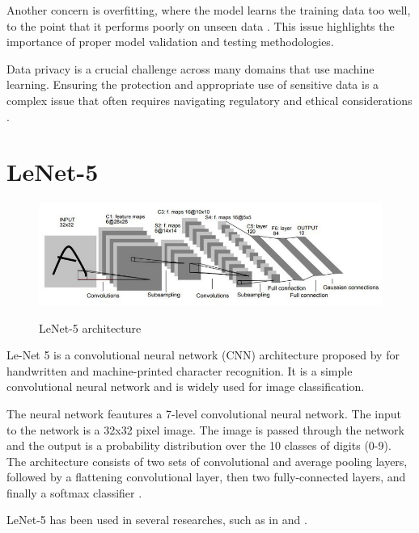 Another concern is overfitting, where the model learns the training data too well, to the point that it performs poorly on unseen data \parencite{Ying2019}. This issue highlights the importance of proper model validation and testing methodologies.

Data privacy is a crucial challenge across many domains that use machine learning. Ensuring the protection and appropriate use of sensitive data is a complex issue that often requires navigating regulatory and ethical considerations \parencite{Strobel2022}.

\newpage
\section{LeNet-5}
\begin{figure}[h]
    \centering
    \includegraphics[scale=0.5]{mainmatter/images/literature review/lenet-5.jpeg}
    \caption{LeNet-5 architecture}
    \label{fig:LeNet-5}
    \textcite{Lecun1998}
\end{figure}

Le-Net 5 is a convolutional neural network (CNN) architecture proposed by \textcite{Lecun1998} for handwritten and machine-printed character recognition. It is a simple convolutional neural network and is widely used for image classification.

The neural network feautures a 7-level convolutional neural network. The input to the network is a 32x32 pixel image. The image is passed through the network and the output is a probability distribution over the 10 classes of digits (0-9). The architecture consists of two sets of convolutional and average pooling layers, followed by a flattening convolutional layer, then two fully-connected layers, and finally a softmax classifier \parencite{Lecun1998}.

LeNet-5 has been used in several researches, such as in \textcite{Isa2021CNNCM} and \textcite{isa2019automated}. 


